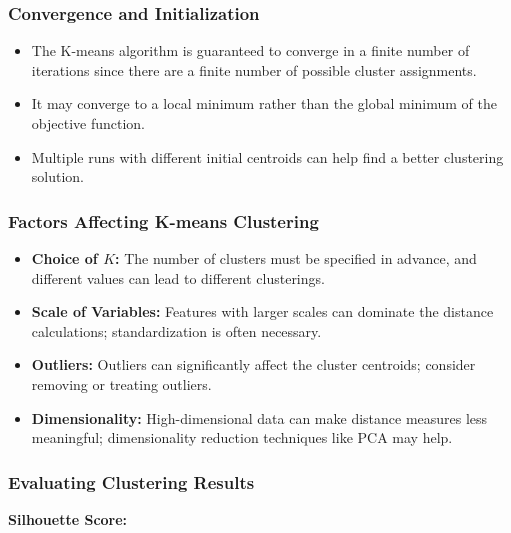 \documentclass{article}
\begin{document}
\subsubsection{Convergence and Initialization}

\begin{itemize}
    \item The K-means algorithm is guaranteed to converge in a finite number of iterations since there are a finite number of possible cluster assignments.
    \item It may converge to a local minimum rather than the global minimum of the objective function.
    \item Multiple runs with different initial centroids can help find a better clustering solution.
\end{itemize}

\subsubsection{Factors Affecting K-means Clustering}

\begin{itemize}
    \item \textbf{Choice of $K$:} The number of clusters must be specified in advance, and different values can lead to different clusterings.
    \item \textbf{Scale of Variables:} Features with larger scales can dominate the distance calculations; standardization is often necessary.
    \item \textbf{Outliers:} Outliers can significantly affect the cluster centroids; consider removing or treating outliers.
    \item \textbf{Dimensionality:} High-dimensional data can make distance measures less meaningful; dimensionality reduction techniques like PCA may help.
\end{itemize}

\subsubsection{Evaluating Clustering Results}

\textbf{Silhouette Score:}
\end{document}
